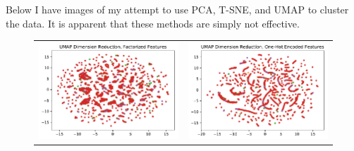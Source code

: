 \documentclass[11pt]{article}
\begin{document}
Below I have images of my attempt to use PCA, T-SNE, and UMAP to cluster
the data. It is apparent that these methods are simply not effective.

    \begin{figure}
        \centering
        \begin{tabular}{c c}
            \includegraphics[scale=.5]{images/UMAP1.pdf}  & \includegraphics[scale=.5]{images/UMAP2.pdf} \\

\end{tabular}
\end{figure}
\end{document}

